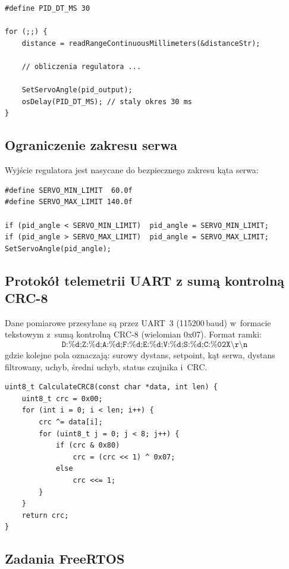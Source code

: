 \begin{lstlisting}[style=cstyle, caption={Stały okres próbkowania w pętli sterowania (main.c)}]
#define PID_DT_MS 30

for (;;) {
    distance = readRangeContinuousMillimeters(&distanceStr);

    // obliczenia regulatora ...

    SetServoAngle(pid_output);
    osDelay(PID_DT_MS); // staly okres 30 ms
}
\end{lstlisting}

\subsection{Ograniczenie zakresu serwa}

Wyjście regulatora jest nasycane do bezpiecznego zakresu kąta serwa:

\begin{lstlisting}[style=cstyle, caption={Saturacja wyjścia i ograniczenia serwa (main.c)}]
#define SERVO_MIN_LIMIT  60.0f
#define SERVO_MAX_LIMIT 140.0f

if (pid_angle < SERVO_MIN_LIMIT)  pid_angle = SERVO_MIN_LIMIT;
if (pid_angle > SERVO_MAX_LIMIT)  pid_angle = SERVO_MAX_LIMIT;
SetServoAngle(pid_angle);
\end{lstlisting}

\subsection{Protokół telemetrii UART z sumą kontrolną CRC-8}

Dane pomiarowe przesyłane są przez UART~3 (115200\,baud) w~formacie
tekstowym z~sumą kontrolną CRC-8 (wielomian 0x07).
Format ramki:
\[
\texttt{D:\%d;Z:\%d;A:\%d;F:\%d;E:\%d;V:\%d;S:\%d;C:\%02X\textbackslash r\textbackslash n}
\]
gdzie kolejne pola oznaczają: surowy dystans, setpoint, kąt serwa,
dystans filtrowany, uchyb, średni uchyb, status czujnika i~CRC.

\begin{lstlisting}[style=cstyle, caption={Implementacja CRC-8 (crc8.c)}]
uint8_t CalculateCRC8(const char *data, int len) {
    uint8_t crc = 0x00;
    for (int i = 0; i < len; i++) {
        crc ^= data[i];
        for (uint8_t j = 0; j < 8; j++) {
            if (crc & 0x80)
                crc = (crc << 1) ^ 0x07;
            else
                crc <<= 1;
        }
    }
    return crc;
}
\end{lstlisting}

\subsection{Zadania FreeRTOS}

